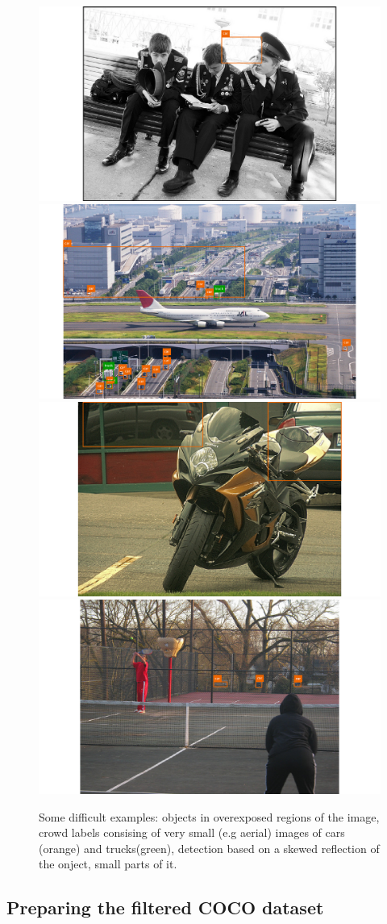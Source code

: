 \begin{figure}[h]
    \captionsetup{width=\textwidth}
    \caption{Some difficult examples: objects in overexposed regions of the image, crowd labels consising of very small (e.g aerial) images of cars (orange) and trucks(green), detection based on a skewed reflection of the onject, small parts of it.}
    \includegraphics[width=.49\textwidth]{figures/car-overexposed.png}
    \includegraphics[width=.49\textwidth]{figures/car-truck-small-crowd.png}\\
    \includegraphics[width=.49\textwidth]{figures/car-reflection-partial.png}\includegraphics[width=.49\textwidth]{figures/car-obscure.png}\\
    \label{fig:coco-difficult}
\end{figure}

\subsection{Preparing the filtered COCO dataset}







